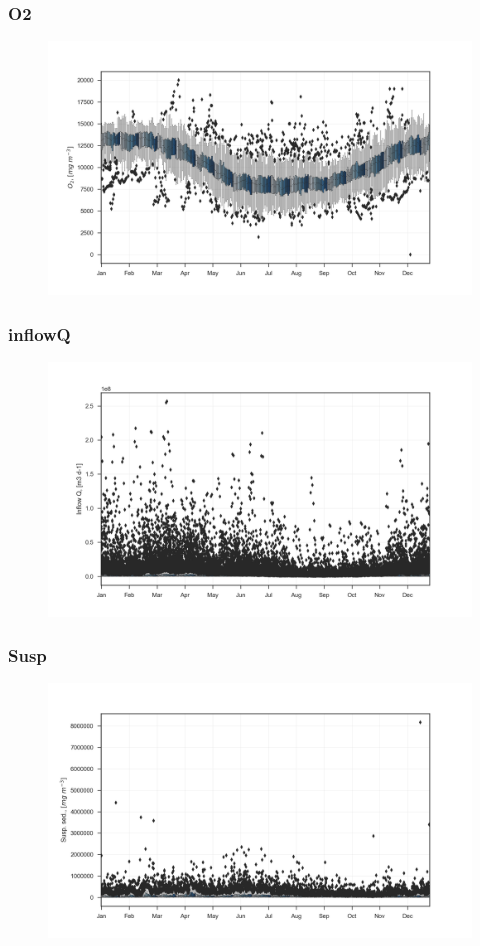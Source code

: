 \documentclass{beamer}
\begin{document}
\begin{frame}
\frametitle{O2}
\begin{figure}
\includegraphics[width=\textwidth]{rivers/all/1yr_boxpl/O2.png}
\end{figure}
\end{frame}

\begin{frame}
\frametitle{inflowQ}
\begin{figure}
\includegraphics[width=\textwidth]{rivers/all/1yr_boxpl/inflowQ.png}
\end{figure}
\end{frame}

\begin{frame}
\frametitle{Susp}
\begin{figure}
\includegraphics[width=\textwidth]{rivers/all/1yr_boxpl/Susp.png}
\end{figure}
\end{frame}
\end{document}
